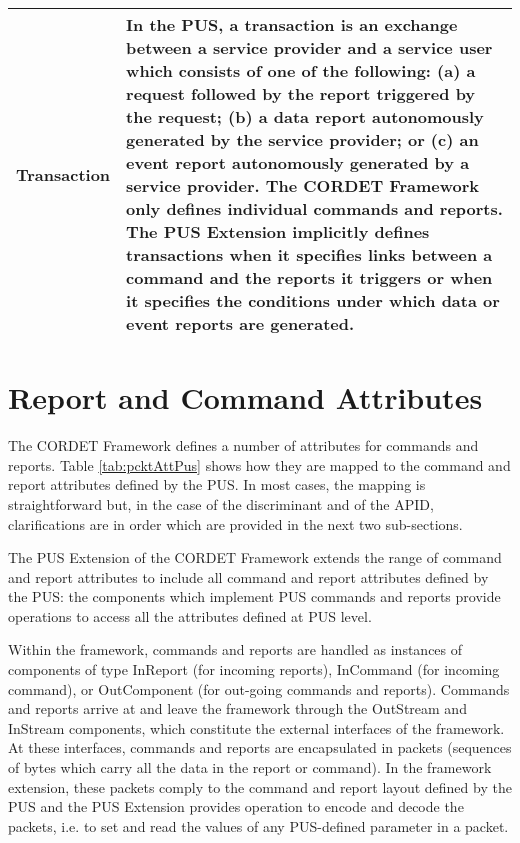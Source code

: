 \documentclass{pnp_article}
\begin{document}
\begin{longtable}{|l|>{\raggedright\arraybackslash}p{10cm}|}
\hline
Transaction & In the PUS, a transaction is an exchange between a service provider and a service user which consists of one of the following: (a) a request followed by the report triggered by the request; (b) a data report autonomously generated by the service provider; or (c) an event report autonomously generated by a service provider. The CORDET Framework only defines individual commands and reports. The PUS Extension implicitly defines transactions when it specifies links between a command and the reports it triggers or when it specifies the conditions under which data or event reports are generated. \\
\hline
\end{longtable} 


\section{Report and Command Attributes}\label{sec:repCmdAttr}
The CORDET Framework defines a number of attributes for commands and reports. Table \ref{tab:pcktAttPus} shows how they are mapped to the command and report attributes defined by the PUS. In most cases, the mapping is straightforward but, in the case of the discriminant and of the APID, clarifications are in order which are provided in the next two sub-sections. 

The PUS Extension of the CORDET Framework extends the range of command and report attributes to include all command and report attributes defined by the PUS: the components which implement PUS commands and reports provide operations to access all the attributes defined at PUS level. 

Within the framework, commands and reports are handled as instances of components of type InReport (for incoming reports), InCommand (for incoming command), or OutComponent (for out-going commands and reports). Commands and reports arrive at and leave the framework through the OutStream and InStream components, which constitute the external interfaces of the framework. At these interfaces, commands and reports are encapsulated in packets (sequences of bytes which carry all the data in the report or command). In the framework extension, these packets comply to the command and report layout defined by the PUS and the PUS Extension provides operation to encode and decode the packets, i.e. to set and read the values of any PUS-defined parameter in a packet. 
\end{document}
